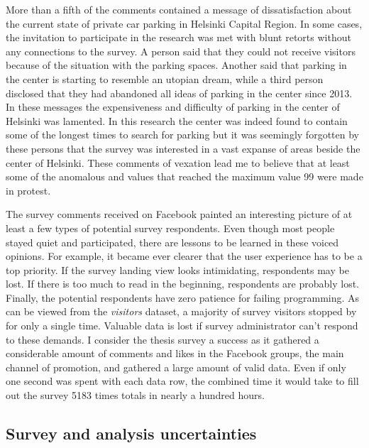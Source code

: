 More than a fifth of the comments contained a message of dissatisfaction about the current state of private car parking in Helsinki Capital Region. In some cases, the invitation to participate in the research was met with blunt retorts without any connections to the survey. A person said that they could not receive visitors because of the situation with the parking spaces. Another said that parking in the center is starting to resemble an utopian dream, while a third person disclosed that they had abandoned all ideas of parking in the center since 2013. In these messages the expensiveness and difficulty of parking in the center of Helsinki was lamented. In this research the center was indeed found to contain some of the longest times to search for parking but it was seemingly forgotten by these persons that the survey was interested in a vast expanse of areas beside the center of Helsinki. These comments of vexation lead me to believe that at least some of the anomalous  and  values that reached the maximum value 99 were made in protest.

The survey comments received on Facebook painted an interesting picture of at least a few types of potential survey respondents. Even though most people stayed quiet and participated, there are lessons to be learned in these voiced opinions. For example, it became ever clearer that the user experience has to be a top priority. If the survey landing view looks intimidating, respondents may be lost. If there is too much to read in the beginning, respondents are probably lost. Finally, the potential respondents have zero patience for failing programming. As can be viewed from the \textit{visitors} dataset, a majority of survey visitors stopped by for only a single time. Valuable data is lost if survey administrator can't respond to these demands. I consider the thesis survey a success as it gathered a considerable amount of comments and likes in the Facebook groups, the main channel of promotion, and gathered a large amount of valid data. Even if only one second was spent with each data row, the combined time it would take to fill out the survey 5183 times totals in nearly a hundred hours.

\newpage
\subsection{Survey and analysis uncertainties}
\justify

